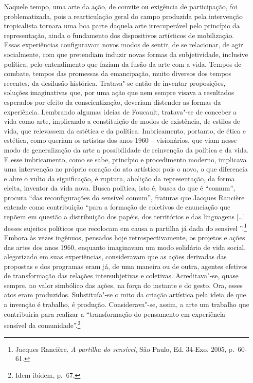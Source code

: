 Naquele tempo, uma arte da ação, de convite ou exigência de
participação, foi problematizada, pois a rearticulação geral do campo
produzida pela intervenção tropicalista tornara uma boa parte daquela
arte irrecuperável pelo princípio da representação, ainda o fundamento
dos dispositivos artísticos de mobilização. Essas experiências
configuravam novos modos de sentir, de se relacionar, de agir
socialmente, com que pretendiam induzir novas formas da subjetividade,
inclusive política, pelo entendimento que faziam da fusão da arte com a
vida. Tempos de combate, tempos das promessas da emancipação, muito
diversos dos tempos recentes, da desilusão histórica. Tratava"-se então
de inventar proposições, soluções imaginativas que, por uma ação que nem
sempre visava a resultados esperados por efeito da conscientização,
deveriam distender as formas da experiência. Lembrando algumas ideias de
Foucault, tratava"-se de conceber a vida como arte, implicando a
constituição de modos de existência, de estilos de vida, que relevassem
da estética e da política. Imbricamento, portanto, de ética e estética,
como queriam os artistas dos anos 1960 -- visionários, que viam nesse
modo de generalização da arte a possibilidade de reinvenção da política
e da vida. E esse imbricamento, como se sabe, princípio e procedimento
moderno, implicava uma intervenção no próprio coração do ato artístico:
pois o novo, o que diferencia e abre o vulto da significação, é ruptura,
abolição da representação, da forma eleita, inventor da vida nova. Busca
política, isto é, busca do que é ``comum'', procura ``das
reconfigurações do sensível comum'', fraturas que Jacques Rancière
entende como contribuição ``para a formação de coletivos de enunciação
que repõem em questão a distribuição dos papéis, dos territórios e das
linguagens {[}\ldots{}{]} desses sujeitos políticos que recolocam em causa a
partilha já dada do sensível	''.\footnote{Jacques Rancière, \emph{A partilha do sensível}, São
Paulo, Ed. 34-Exo, 2005, p.~60-61.} Embora às vezes
ingênuos, pensados hoje retrospectivamente, os projetos e ações das
artes dos anos 1960, enquanto imaginavam um modo solidário de vida
social, alegorizado em suas experiências, consideravam que as ações
derivadas das propostas e dos programas eram já, de uma maneira ou de
outra, agentes efetivos de transformação das relações intersubjetivas e
coletivas. Acreditava"-se, quase sempre, no valor simbólico das ações, na
força do instante e do gesto. Ora, esses atos eram produzidos.
Substituía"-se o mito da criação artística pela ideia de que a invenção é
trabalho, é produção. Considerava"-se, assim, a arte um trabalho que
contribuiria para realizar a ``transformação do pensamento em
experiência sensível da comunidade''.\footnote{Idem ibidem, p.~67.}

